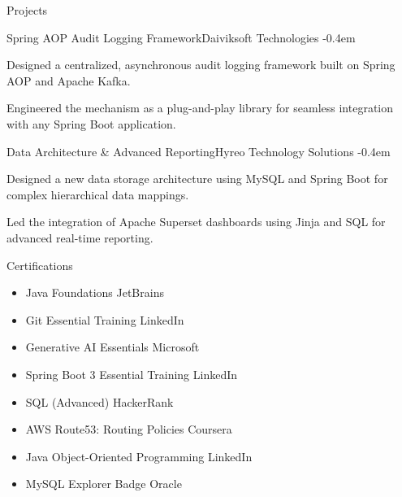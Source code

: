 \documentclass{resume} %
\begin{document}
\begin{rSection}{Projects}

\begin{rSubsection}{Spring AOP Audit Logging Framework}{}{Daiviksoft Technologies}{}
    \itemsep -0.4em
    \vspace{-0.5em} %


    \item Designed a centralized, asynchronous audit logging framework built on Spring AOP and Apache Kafka.
    \item Engineered the mechanism as a plug-and-play library for seamless integration with any Spring Boot application.
\end{rSubsection}
\vspace{-0.4em} %

\begin{rSubsection}{Data Architecture \& Advanced Reporting}{}{Hyreo Technology Solutions}{}
    \itemsep -0.4em
    \vspace{-0.5em} %


    \item Designed a new data storage architecture using MySQL and Spring Boot for complex hierarchical data mappings.
    \item Led the integration of Apache Superset dashboards using Jinja and SQL for advanced real-time reporting.
\end{rSubsection}

\end{rSection}

\begin{rSection}{Certifications}
\begin{itemize}
    \itemsep -0.3em
    \item Java Foundations \hfill {JetBrains}
    \item Git Essential Training \hfill {LinkedIn}
    \item Generative AI Essentials \hfill {Microsoft}
    \item Spring Boot 3 Essential Training \hfill {LinkedIn}
    \item SQL (Advanced) \hfill {HackerRank}
    \item AWS Route53: Routing Policies \hfill {Coursera}
    \item Java Object-Oriented Programming \hfill {LinkedIn}
    \item MySQL Explorer Badge \hfill {Oracle}
\end{itemize}
\end{rSection}
\end{document}
